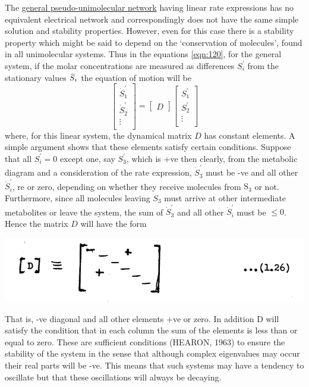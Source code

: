 The \underline{general pseudo-unimolecular network} having linear rate expressions has no equivalent electrical network and correspondingly does not have the same simple solution and stability properties. However, even for this case there is a stability property which might be said to depend on the `conservation of molecules', found in all unimolecular systems. Thus in the equations \eqref{eqn:120}, for the general system, if the molar concentrations are measured as differences $S_{i}^{\prime}$ from the stationary values $\,\overline{\!{S}}_{i}$ the equation of motion will be
%
\begin{equation}
\left[\begin{array}{c}
\dot{S}_1^{\prime} \\[5pt]
\dot{S}_2^{\prime} \\
\vdots \\
\end{array}\right]=\left[\begin{array}{l}
D
\end{array}\right]\left[\begin{array}{c}
S_1^{\prime} \\[5pt]
S_2^{\prime} \\
\vdots \\
\end{array}\right]
\label{eqn:125}
\end{equation}
%
where, for this linear system, the dynamical matrix $D$ has constant elements. A simple argument shows that these elements satisfy certain conditions. Suppose that all $S_{i}^{\prime}=0$ except one, say $S_{3}^{\prime}$, which is +ve then clearly, from the metabolic diagram and a consideration of the rate expression, $\dot{S}_{3}^{\prime}$ must be -ve and all other $\dot{S}_{i}^{\prime}$, re or zero, depending on whether they receive molecules from $\mathrm{S}_{3}$ or not. Furthermore, since all molecules leaving $S_{3}$ must arrive at other intermediate metabolites or leave the system, the sum of $\dot{S}_{3}^{\prime}$ and all other $\dot{S}_{i}^{\prime}$ must be $\leq 0$. Hence the matrix $D$ will have the form

\includegraphics[scale=0.55]{figure1_1_26}

That is, -ve diagonal and all other elements +ve or zero. In addition D will satisfy the condition that in each column the sum of the elements is less than or equal to zero. These are sufficient conditions (HEARON, 1963) to ensure the stability of the system in the sense that although complex eigenvalues may occur their real parts will be -ve. This means that such systems may have a tendency to oscillate but that these oscillations will always be decaying.

